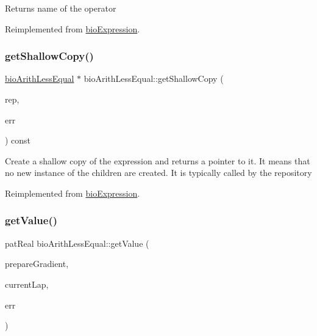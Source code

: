 \begin{DoxyReturn}{Returns}
name of the operator 
\end{DoxyReturn}


Reimplemented from \hyperlink{classbio_expression_a2353a4afb3a2b0af7c63aba086a72bde}{bio\+Expression}.

\mbox{\label{classbio_arith_less_equal_a47164bfceb3759082555502a38e9f70b}} 
\subsubsection{\texorpdfstring{get\+Shallow\+Copy()}{getShallowCopy()}}
{\footnotesize\ttfamily \hyperlink{classbio_arith_less_equal}{bio\+Arith\+Less\+Equal} $\ast$ bio\+Arith\+Less\+Equal\+::get\+Shallow\+Copy (\begin{DoxyParamCaption}\item[{\hyperlink{classbio_expression_repository}{bio\+Expression\+Repository} $\ast$}]{rep,  }\item[{pat\+Error $\ast$\&}]{err }\end{DoxyParamCaption}) const\hspace{0.3cm}{\ttfamily [virtual]}}

Create a shallow copy of the expression and returns a pointer to it. It means that no new instance of the children are created. It is typically called by the repository 

Reimplemented from \hyperlink{classbio_expression_a442534762693b92baaf33928979a1bf8}{bio\+Expression}.

\mbox{\label{classbio_arith_less_equal_af1741ef7a088b6a961889cd82fae3206}} 
\subsubsection{\texorpdfstring{get\+Value()}{getValue()}}
{\footnotesize\ttfamily pat\+Real bio\+Arith\+Less\+Equal\+::get\+Value (\begin{DoxyParamCaption}\item[{pat\+Boolean}]{prepare\+Gradient,  }\item[{pat\+U\+Long}]{current\+Lap,  }\item[{pat\+Error $\ast$\&}]{err }\end{DoxyParamCaption})\hspace{0.3cm}{\ttfamily [virtual]}}

